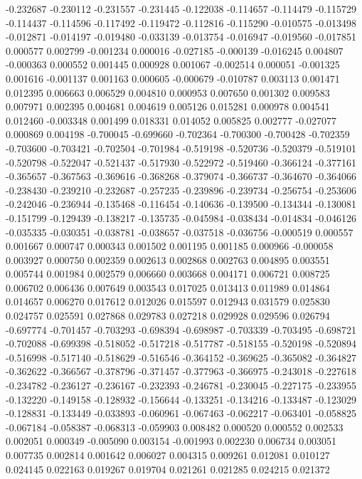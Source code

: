 -0.232687
-0.230112
-0.231557
-0.231445
-0.122038
-0.114657
-0.114479
-0.115729
-0.114437
-0.114596
-0.117492
-0.119472
-0.112816
-0.115290
-0.010575
-0.013498
-0.012871
-0.014197
-0.019480
-0.033139
-0.013754
-0.016947
-0.019560
-0.017851
0.000577
0.002799
-0.001234
0.000016
-0.027185
-0.000139
-0.016245
0.004807
-0.000363
0.000552
0.001445
0.000928
0.001067
-0.002514
0.000051
-0.001325
0.001616
-0.001137
0.001163
0.000605
-0.000679
-0.010787
0.003113
0.001471
0.012395
0.006663
0.006529
0.004810
0.000953
0.007650
0.001302
0.009583
0.007971
0.002395
0.004681
0.004619
0.005126
0.015281
0.000978
0.004541
0.012460
-0.003348
0.001499
0.018331
0.014052
0.005825
0.002777
-0.027077
0.000869
0.004198
-0.700045
-0.699660
-0.702364
-0.700300
-0.700428
-0.702359
-0.703600
-0.703421
-0.702504
-0.701984
-0.519198
-0.520736
-0.520379
-0.519101
-0.520798
-0.522047
-0.521437
-0.517930
-0.522972
-0.519460
-0.366124
-0.377161
-0.365657
-0.367563
-0.369616
-0.368268
-0.379074
-0.366737
-0.364670
-0.364066
-0.238430
-0.239210
-0.232687
-0.257235
-0.239896
-0.239734
-0.256754
-0.253606
-0.242046
-0.236944
-0.135468
-0.116454
-0.140636
-0.139500
-0.134344
-0.130081
-0.151799
-0.129439
-0.138217
-0.135735
-0.045984
-0.038434
-0.014834
-0.046126
-0.035335
-0.030351
-0.038781
-0.038657
-0.037518
-0.036756
-0.000519
0.000557
0.001667
0.000747
0.000343
0.001502
0.001195
0.001185
0.000966
-0.000058
0.003927
0.000750
0.002359
0.002613
0.002868
0.002763
0.004895
0.003551
0.005744
0.001984
0.002579
0.006660
0.003668
0.004171
0.006721
0.008725
0.006702
0.006436
0.007649
0.003543
0.017025
0.013413
0.011989
0.014864
0.014657
0.006270
0.017612
0.012026
0.015597
0.012943
0.031579
0.025830
0.024757
0.025591
0.027868
0.029783
0.027218
0.029928
0.029596
0.026794
-0.697774
-0.701457
-0.703293
-0.698394
-0.698987
-0.703339
-0.703495
-0.698721
-0.702088
-0.699398
-0.518052
-0.517218
-0.517787
-0.518155
-0.520198
-0.520894
-0.516998
-0.517140
-0.518629
-0.516546
-0.364152
-0.369625
-0.365082
-0.364827
-0.362622
-0.366567
-0.378796
-0.371457
-0.377963
-0.366975
-0.243018
-0.227618
-0.234782
-0.236127
-0.236167
-0.232393
-0.246781
-0.230045
-0.227175
-0.233955
-0.132220
-0.149158
-0.128932
-0.156644
-0.133251
-0.134216
-0.133487
-0.123029
-0.128831
-0.133449
-0.033893
-0.060961
-0.067463
-0.062217
-0.063401
-0.058825
-0.067184
-0.058387
-0.068313
-0.059903
0.008482
0.000520
0.000552
0.002533
0.002051
0.000349
-0.005090
0.003154
-0.001993
0.002230
0.006734
0.003051
0.007735
0.002814
0.001642
0.006027
0.004315
0.009261
0.012081
0.010127
0.024145
0.022163
0.019267
0.019704
0.021261
0.021285
0.024215
0.021372
